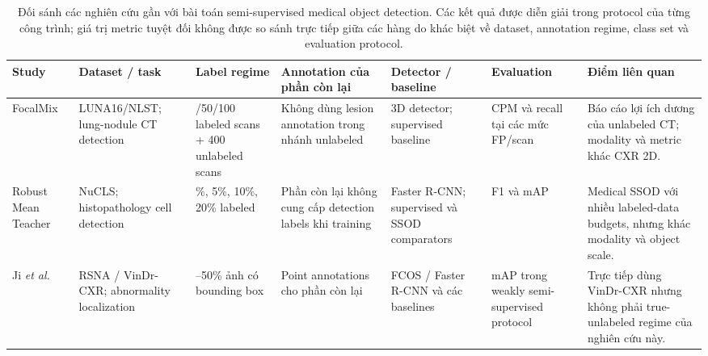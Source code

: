 \documentclass[pdflatex,sn-mathphys-num]{sn-jnl}%
\theoremstyle{thmstyleone}%
\theoremstyle{thmstyletwo}%
\theoremstyle{thmstylethree}%
\begin{document}
\begin{table}
\centering

\caption{Đối sánh các nghiên cứu gần với bài toán semi-supervised medical object
detection. Các kết quả được diễn giải trong protocol của từng công trình; giá trị
metric tuyệt đối không được so sánh trực tiếp giữa các hàng do khác biệt về
dataset, annotation regime, class set và evaluation protocol.}
\label{tab:medical_ssod_comparison}

\footnotesize
\setlength{\tabcolsep}{3.2pt}
\renewcommand{\arraystretch}{1.16}

\begin{tabular}{
>{\raggedright\arraybackslash}p{2.8cm}
>{\raggedright\arraybackslash}p{3.4cm}
>{\raggedright\arraybackslash}p{3.2cm}
>{\raggedright\arraybackslash}p{3.6cm}
>{\raggedright\arraybackslash}p{4.2cm}
>{\raggedright\arraybackslash}p{3.5cm}
>{\raggedright\arraybackslash}p{5.0cm}
}
\toprule

\textbf{Study} &
\textbf{Dataset / task} &
\textbf{Label regime} &
\textbf{Annotation của phần còn lại} &
\textbf{Detector / baseline} &
\textbf{Evaluation} &
\textbf{Điểm liên quan} \\

\midrule

FocalMix \cite{wang2020focalmix} &
LUNA16/NLST; lung-nodule CT detection &
25/50/100 labeled scans + 400 unlabeled scans &
Không dùng lesion annotation trong nhánh unlabeled &
3D detector; supervised baseline &
CPM và recall tại các mức FP/scan &
Báo cáo lợi ích dương của unlabeled CT; modality và metric khác CXR 2D. \\

\addlinespace[4pt]

Robust Mean Teacher \cite{wen2024robust} &
NuCLS; histopathology cell detection &
2\%, 5\%, 10\%, 20\% labeled &
Phần còn lại không cung cấp detection labels khi training &
Faster R-CNN; supervised và SSOD comparators &
F1 và mAP &
Medical SSOD với nhiều labeled-data budgets, nhưng khác modality và object scale. \\

\addlinespace[4pt]

Ji \textit{et al.} \cite{ji2022benchmark} &
RSNA / VinDr-CXR; abnormality localization &
5--50\% ảnh có bounding box &
Point annotations cho phần còn lại &
FCOS / Faster R-CNN và các baselines &
mAP trong weakly semi-supervised protocol &
Trực tiếp dùng VinDr-CXR nhưng không phải true-unlabeled regime của nghiên cứu này. \\


\end{tabular}
\end{table}
\end{document}
